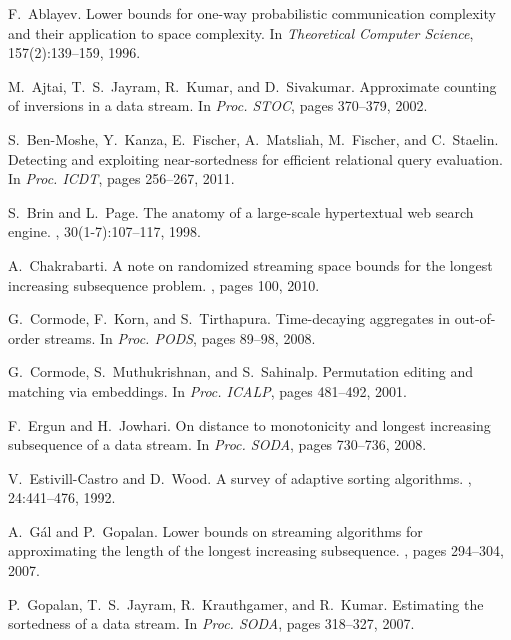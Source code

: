 \documentclass{llncs}
\begin{document}
{\small
\begin{thebibliography}{10}

F.~Ablayev.
\newblock Lower bounds for one-way probabilistic communication complexity and
their application to space complexity.
\newblock In {\em Theoretical Computer Science}, 157(2):139--159, 1996.

M.~Ajtai, T.~S.~Jayram, R.~Kumar, and D.~Sivakumar.
\newblock Approximate counting of inversions in a data stream.
\newblock In {\em Proc. STOC}, pages 370--379, 2002.

S.~Ben-Moshe, Y.~Kanza, E.~Fischer, A.~Matsliah, M.~Fischer, and
  C.~Staelin.
\newblock Detecting and exploiting near-sortedness for efficient relational
  query evaluation.
\newblock In {\em Proc. ICDT}, pages 256--267, 2011.

S.~Brin and L.~Page.
\newblock The anatomy of a large-scale hypertextual web search engine.
, 30(1-7):107--117, 1998.

A.~Chakrabarti.
\newblock A note on randomized streaming space bounds for the longest increasing
subsequence problem.
, pages 100, 2010.

G.~Cormode, F.~Korn, and S.~Tirthapura.
\newblock Time-decaying aggregates in out-of-order streams.
\newblock In {\em Proc. PODS}, pages 89--98, 2008.

G.~Cormode, S.~Muthukrishnan, and S.~Sahinalp.
\newblock Permutation editing and matching via embeddings.
\newblock In {\em Proc. ICALP}, pages 481--492, 2001.

F.~Ergun and H.~Jowhari.
\newblock On distance to monotonicity and longest increasing subsequence of a
  data stream.
\newblock In {\em Proc. SODA}, pages 730--736, 2008.

V.~Estivill-Castro and D.~Wood.
\newblock A survey of adaptive sorting algorithms.
, 24:441--476, 1992.

A.~G{\'a}l and P.~Gopalan.
\newblock Lower bounds on streaming algorithms for approximating the length of
  the longest increasing subsequence.
, pages 294--304, 2007.

P.~Gopalan, T.~S.~Jayram, R.~Krauthgamer, and R.~Kumar.
\newblock Estimating the sortedness of a data stream.
\newblock In {\em Proc. SODA}, pages 318--327, 2007.


\end{thebibliography}}
\end{document}
